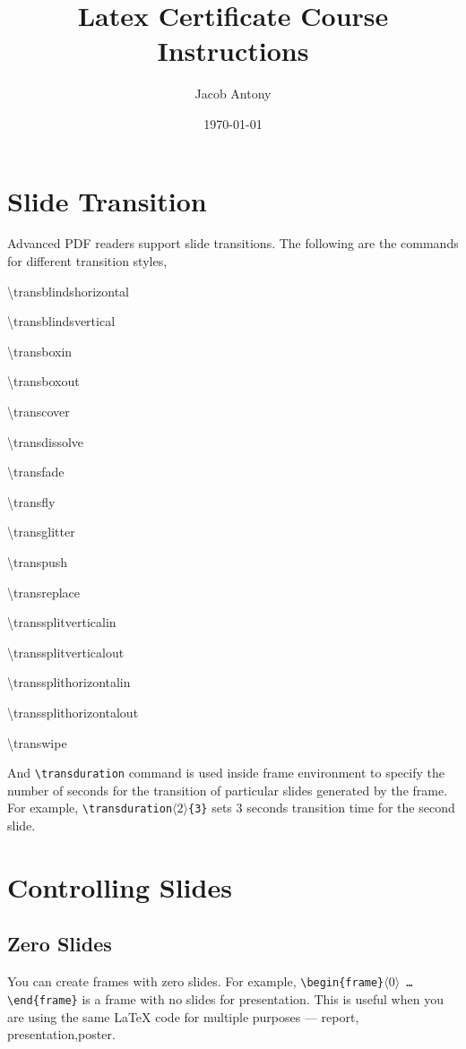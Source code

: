 \documentclass{article}
\title{Latex Certificate Course Instructions}
\author{Jacob Antony}
\date{\today}
\begin{document}
\maketitle
\section{Slide Transition}
	Advanced PDF readers support slide transitions. The following are the commands for different transition styles,
\begin{enumerate*}
	\item \textbackslash transblindshorizontal
	\item \textbackslash transblindsvertical
	\item \textbackslash transboxin
	\item \textbackslash transboxout
	\item \textbackslash transcover
	\item \textbackslash transdissolve
	\item \textbackslash transfade
	\item \textbackslash transfly
	\item \textbackslash transglitter
	\item \textbackslash transpush
	\item \textbackslash transreplace
	\item \textbackslash transsplitverticalin
	\item \textbackslash transsplitverticalout
	\item \textbackslash transsplithorizontalin
	\item \textbackslash transsplithorizontalout
	\item \textbackslash transwipe
\end{enumerate*}

	And \texttt{\textbackslash transduration} command is used inside frame environment to specify the number of seconds for the transition of particular slides generated by the frame. For example, \texttt{\textbackslash transduration$\langle2\rangle$\{3\}} sets $3$ seconds transition time for the second slide.

\section{Controlling Slides}
\subsection{Zero Slides}
	You can create frames with zero slides. For example, \texttt{\textbackslash begin\{frame\}$\langle 0 \rangle$ \dots \textbackslash end\{frame\}} is a frame with no slides for presentation. This is useful when you are using the same \LaTeX{} code for multiple purposes --- report, presentation,poster.
\end{document}
